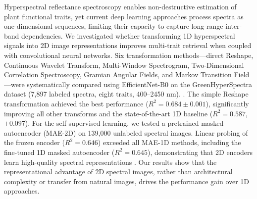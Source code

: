 Hyperspectral reflectance spectroscopy enables non-destructive estimation of plant functional traits, yet current deep learning approaches process spectra as one-dimensional sequences, limiting their capacity to capture long-range inter-band dependencies. We investigated whether transforming 1D hyperspectral signals into 2D image representations improves multi-trait retrieval when coupled with convolutional neural networks. Six transformation methods---direct Reshape, Continuous Wavelet Transform, Multi-Window Spectrogram, Two-Dimensional Correlation Spectroscopy, Gramian Angular Fields, and Markov Transition Field---were systematically compared using EfficientNet-B0 on the GreenHyperSpectra dataset (7,897 labeled spectra, eight traits, 400--2450 nm). . The simple Reshape transformation achieved the best performance ($R^2 = 0.684 \pm 0.001$), significantly improving all other transforms and the state-of-the-art 1D baseline ($R^2 = 0.587$, $+0.097$). For the self-supervised learning, we tested a pretrained masked autoencoder (MAE-2D) on 139,000 unlabeled spectral images. Linear probing of the frozen encoder ($R^2 = 0.646$) exceeded all MAE-1D methods, including the fine-tuned 1D masked autoencoder ($R^2 = 0.645$), demonstrating that 2D encoders learn high-quality spectral representations  . Our results show that the representational advantage of 2D spectral images, rather than architectural complexity or transfer from natural images, drives the performance gain over 1D approaches.

